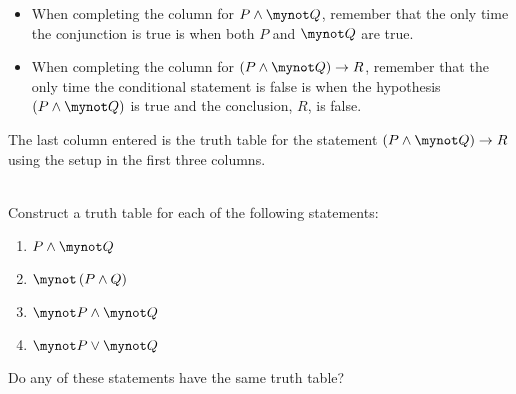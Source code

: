 \begin{itemize}
  \item When completing the column for  $P \wedge \mynot  Q$, remember that the only time the conjunction is true is when both  $P$  and  $\mynot  Q$ are true.  
  \item When completing the column for  $\left( {P \wedge \mynot  Q} \right) \to R$, remember that the only time the conditional statement is false is when the hypothesis $\left( {P \wedge \mynot  Q} \right)$ is true and the conclusion, $R$, is false.  
\end{itemize}
The last column entered is the truth table for the statement  $\left( {P \wedge \mynot  Q} \right) \to R$ using the setup in the first three columns.
%
\begin{prog}\label{pr:truthtables} \hfill \\
Construct a truth table for each of the following statements: 
\label{exer:sec22-4}%
  \begin{multicols}{2}
  \begin{enumerate}
    \item $P \wedge \mynot  Q$
    \item $\mynot  \left( {P \wedge Q} \right)$
    \item $\mynot  P \wedge \mynot  Q$
    \item $\mynot  P \vee \mynot  Q$
  \end{enumerate}
  \end{multicols}
\noindent
Do any of these statements have the same truth table?
\end{prog}
\hbreak


\endinput

